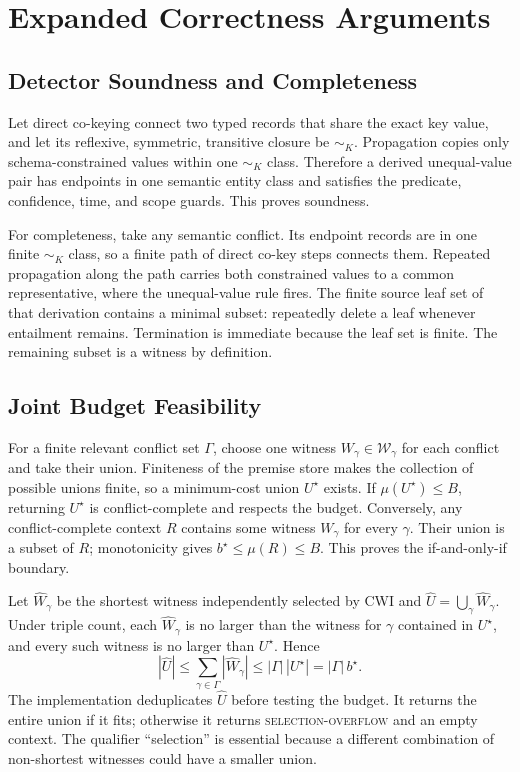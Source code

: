 \documentclass[letterpaper]{article}
\newcommand{\cwi}{\textsc{CWI}}
\newcommand{\W}{\mathcal{W}}
\begin{document}
\section{Expanded Correctness Arguments}

\subsection{Detector Soundness and Completeness}

Let direct co-keying connect two typed records that share the exact key value,
and let its reflexive, symmetric, transitive closure be $\sim_K$.  Propagation
copies only schema-constrained values within one $\sim_K$ class.  Therefore a
derived unequal-value pair has endpoints in one semantic entity class and
satisfies the predicate, confidence, time, and scope guards.  This proves
soundness.

For completeness, take any semantic conflict.  Its endpoint records are in one
finite $\sim_K$ class, so a finite path of direct co-key steps connects them.
Repeated propagation along the path carries both constrained values to a
common representative, where the unequal-value rule fires.  The finite source
leaf set of that derivation contains a minimal subset: repeatedly delete a
leaf whenever entailment remains.  Termination is immediate because the leaf
set is finite.  The remaining subset is a witness by definition.

\subsection{Joint Budget Feasibility}

For a finite relevant conflict set $\Gamma$, choose one witness
$W_\gamma\in\W_\gamma$ for each conflict and take their union.  Finiteness of
the premise store makes the collection of possible unions finite, so a
minimum-cost union $U^\star$ exists.  If $\mu(U^\star)\le B$, returning
$U^\star$ is conflict-complete and respects the budget.  Conversely, any
conflict-complete context $R$ contains some witness $W_\gamma$ for every
$\gamma$.  Their union is a subset of $R$; monotonicity gives
$b^\star\le\mu(R)\le B$.  This proves the if-and-only-if boundary.

Let $\widehat W_\gamma$ be the shortest witness independently selected by
\cwi{} and $\widehat U=\bigcup_\gamma\widehat W_\gamma$.  Under triple count,
each $\widehat W_\gamma$ is no larger than the witness for $\gamma$ contained
in $U^\star$, and every such witness is no larger than $U^\star$.  Hence
\[
|\widehat U|\le\sum_{\gamma\in\Gamma}|\widehat W_\gamma|
\le |\Gamma|\,|U^\star|=|\Gamma|\,b^\star.
\]
The implementation deduplicates $\widehat U$ before testing the budget.  It
returns the entire union if it fits; otherwise it returns
\textsc{selection-overflow} and an empty context.  The qualifier ``selection''
is essential because a different combination of non-shortest witnesses could
have a smaller union.
\end{document}
